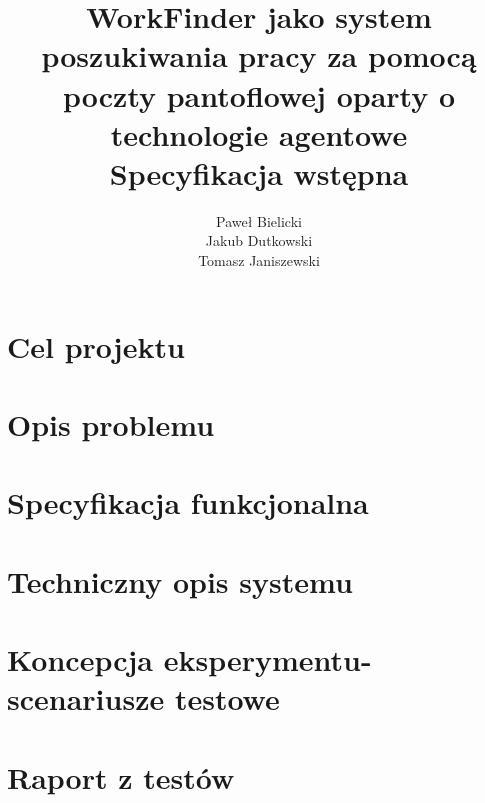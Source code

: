 \documentclass[11pt,a4paper]{article}
\author{
	Paweł Bielicki\\
	Jakub Dutkowski\\
	Tomasz Janiszewski
}
\title{
	\huge{WorkFinder jako system poszukiwania pracy za pomocą poczty pantoflowej oparty o technologie agentowe}\\
	\LARGE{Specyfikacja wstępna}
 }
\begin{document}
\maketitle
\newpage

\section{Cel projektu}


\section{Opis problemu}


\section{Specyfikacja funkcjonalna}


\section{Techniczny opis systemu}


\section{Koncepcja eksperymentu- scenariusze testowe}


\section{Raport z testów}

	
\end{document}
